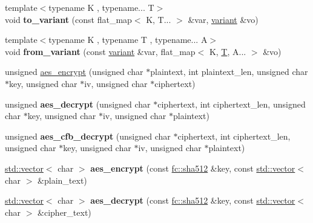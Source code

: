 \begin{DoxyCompactItemize}
\item 
\mbox{\label{namespacefc_ab564f2002da2ec0ca35cd2f5224f57b5}} 
{\footnotesize template$<$typename K , typename... T$>$ }\\void {\bfseries to\+\_\+variant} (const flat\+\_\+map$<$ K, T... $>$ \&var, \mbox{\hyperlink{classfc_1_1variant}{variant}} \&vo)
\item 
\mbox{\label{namespacefc_afb960b5e41d7ee7db75077a863461694}} 
{\footnotesize template$<$typename K , typename T , typename... A$>$ }\\void {\bfseries from\+\_\+variant} (const \mbox{\hyperlink{classfc_1_1variant}{variant}} \&var, flat\+\_\+map$<$ K, \mbox{\hyperlink{struct_t}{T}}, A... $>$ \&vo)
\item 
unsigned \mbox{\hyperlink{namespacefc_a71eea521fccf7c6c7a01402d66de6a3f}{aes\+\_\+encrypt}} (unsigned char $\ast$plaintext, int plaintext\+\_\+len, unsigned char $\ast$key, unsigned char $\ast$iv, unsigned char $\ast$ciphertext)
\item 
\mbox{\label{namespacefc_a17a540884c97b458fd605c12222e8070}} 
unsigned {\bfseries aes\+\_\+decrypt} (unsigned char $\ast$ciphertext, int ciphertext\+\_\+len, unsigned char $\ast$key, unsigned char $\ast$iv, unsigned char $\ast$plaintext)
\item 
\mbox{\label{namespacefc_a34e6438dfb3596540f7bf52faf97bbd2}} 
unsigned {\bfseries aes\+\_\+cfb\+\_\+decrypt} (unsigned char $\ast$ciphertext, int ciphertext\+\_\+len, unsigned char $\ast$key, unsigned char $\ast$iv, unsigned char $\ast$plaintext)
\item 
\mbox{\label{namespacefc_af00401a48f0a79a846a8f6db60591d47}} 
\mbox{\hyperlink{classstd_1_1vector}{std\+::vector}}$<$ char $>$ {\bfseries aes\+\_\+encrypt} (const \mbox{\hyperlink{classfc_1_1sha512}{fc\+::sha512}} \&key, const \mbox{\hyperlink{classstd_1_1vector}{std\+::vector}}$<$ char $>$ \&plain\+\_\+text)
\item 
\mbox{\label{namespacefc_abaec8d5ba81a275a867004314358730c}} 
\mbox{\hyperlink{classstd_1_1vector}{std\+::vector}}$<$ char $>$ {\bfseries aes\+\_\+decrypt} (const \mbox{\hyperlink{classfc_1_1sha512}{fc\+::sha512}} \&key, const \mbox{\hyperlink{classstd_1_1vector}{std\+::vector}}$<$ char $>$ \&cipher\+\_\+text)

\end{DoxyCompactItemize}
